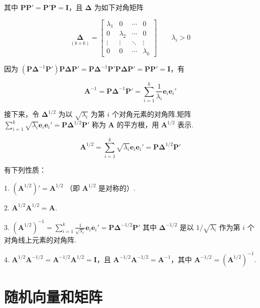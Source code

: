 
其中 $\bm{P}\bm{P}'=\bm{P}'\bm{P}=\bm{I}$，且 $\bm{\Delta}$ 为如下对角矩阵

\[
\underset{(k\times k)}{\bm{\Delta}}=
\begin{bmatrix}
\lambda_1 & 0 & \cdots & 0\\
0 & \lambda_2 & \cdots & 0\\
\vdots & \vdots & \ddots & \vdots\\
0 & 0 & \cdots & \lambda_k
\end{bmatrix}
\qquad \lambda_i>0
\]

因为 $(\bm{P}\bm{\Delta}^{-1}\bm{P}')\bm{P}\bm{\Delta}\bm{P}'=\bm{P}\bm{\Delta}^{-1}\bm{P}'\bm{P}\bm{\Delta}\bm{P}'=\bm{P}\bm{P}'=\bm{I}$，有

\label{eq:2-21}
\begin{equation}
\bm{A}^{-1}=\bm{P}\bm{\Delta}^{-1}\bm{P}'=\sum_{i=1}^{k}\frac{1}{\lambda_i}\bm{e}_i\bm{e}_i' \tag{2-21}
\end{equation}

接下来，令 $\bm{\Delta}^{1/2}$ 为以 $\sqrt{\lambda_i}$ 为第 $i$ 个对角元素的对角阵.矩阵 $\sum\limits_{i=1}^{k}\sqrt{\lambda_i}\bm{e}_i\bm{e}_i'=\bm{P}\bm{\Delta}^{1/2}\bm{P}'$ 称为 $\bm{A}$ 的平方根，用 $\bm{A}^{1/2}$ 表示.

\begin{mvframe}

\label{eq:2-22}
\begin{equation}
\bm{A}^{1/2}=\sum_{i=1}^{k}\sqrt{\lambda_i}\bm{e}_i\bm{e}_i'=\bm{P}\bm{\Delta}^{1/2}\bm{P}' \tag{2-22}
\end{equation}

有下列性质：

1. $(\bm{A}^{1/2})'=\bm{A}^{1/2}$ （即 $\bm{A}^{1/2}$ 是对称的）.

2. $\bm{A}^{1/2}\bm{A}^{1/2}=\bm{A}$.

3. $(\bm{A}^{1/2})^{-1}=\sum\limits_{i=1}^{k}\frac{1}{\sqrt{\lambda_i}}\bm{e}_i\bm{e}_i'=\bm{P}\bm{\Delta}^{-1/2}\bm{P}'$ 其中 $\bm{\Delta}^{-1/2}$ 是以 $1/\sqrt{\lambda_i}$ 作为第 $i$ 个对角线上元素的对角阵.

4. $\bm{A}^{1/2}\bm{A}^{-1/2}=\bm{A}^{-1/2}\bm{A}^{1/2}=\bm{I}$，且 $\bm{A}^{-1/2}\bm{A}^{-1/2}=\bm{A}^{-1}$，其中 $\bm{A}^{-1/2}=(\bm{A}^{1/2})^{-1}$.
\end{mvframe}

\section{随机向量和矩阵}  %
\label{sec:2.5}

